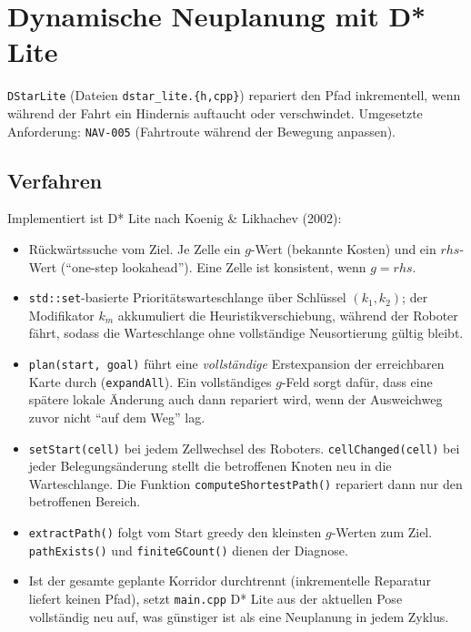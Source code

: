 \documentclass[
  a4paper,
  12pt,
  DIV=12,        %
  parskip=half,  %
  headings=small %
]{scrartcl}
\theoremstyle{definition}
\providecommand{\tightlist}{%
  \setlength{\itemsep}{0pt}\setlength{\parskip}{0pt}}
\theoremstyle{definition}
\begin{document}
\section{Dynamische Neuplanung mit D* Lite}\label{dstar}

\texttt{DStarLite} (Dateien \texttt{dstar\_lite.\{h,cpp\}}) repariert den
Pfad inkrementell, wenn während der Fahrt ein Hindernis auftaucht oder
verschwindet. Umgesetzte Anforderung: \texttt{NAV-005} (Fahrtroute
während der Bewegung anpassen).

\subsection{Verfahren}\label{dstar-verfahren}

Implementiert ist D* Lite nach Koenig \& Likhachev (2002):

\begin{itemize}
\tightlist
\item
  Rückwärtssuche vom Ziel. Je Zelle ein $g$-Wert (bekannte Kosten) und
  ein $rhs$-Wert (\enquote{one-step lookahead}). Eine Zelle ist
  konsistent, wenn $g = rhs$.
\item
  \texttt{std::set}-basierte Prioritätswarteschlange über
  Schlüssel $(k_1, k_2)$; der Modifikator $k_m$ akkumuliert die
  Heuristik\-verschiebung, während der Roboter fährt, sodass die
  Warteschlange ohne vollständige Neusortierung gültig bleibt.
\item
  \texttt{plan(start, goal)} führt eine \emph{vollständige}
  Erstexpansion der erreichbaren Karte durch (\texttt{expandAll}). Ein
  vollständiges $g$-Feld sorgt dafür, dass eine spätere lokale Änderung
  auch dann repariert wird, wenn der Ausweichweg zuvor nicht \enquote{auf
  dem Weg} lag.
\item
  \texttt{setStart(cell)} bei jedem Zellwechsel des Roboters.
  \texttt{cellChanged(cell)} bei jeder Belegungsänderung stellt die
  betroffenen Knoten neu in die Warteschlange. Die Funktion
  \texttt{computeShortestPath()} repariert dann nur den betroffenen
  Bereich.
\item
  \texttt{extractPath()} folgt vom Start greedy den kleinsten
  $g$-Werten zum Ziel. \texttt{pathExists()} und
  \texttt{finiteGCount()} dienen der Diagnose.
\item
  Ist der gesamte geplante Korridor durchtrennt (inkrementelle Reparatur
  liefert keinen Pfad), setzt \texttt{main.cpp} D* Lite aus der aktuellen
  Pose vollständig neu auf, was günstiger ist als eine
  Neuplanung in jedem Zyklus.
\end{itemize}
\end{document}
